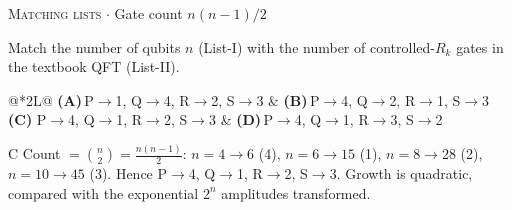 \documentclass[11pt,a4paper]{article}
\newcommand{\optlabel}[1]{\textbf{(#1)}}
\newcommand{\correctlabel}[1]{\textcolor{okgreen}{\textbf{(#1)}\,\ding{51}}}
\newenvironment{qitem}[1]{\begin{list}{}{\setlength{\leftmargin}{3.3em}\setlength{\labelwidth}{3.1em}%
  \setlength{\labelsep}{0.2em}\setlength{\topsep}{3pt}\setlength{\parsep}{3pt}}\item[\textbf{Q.#1}\hfill]}{\end{list}}
\newcommand{\qsep}{\par\vspace{2pt}{\color{black!15}\hrule}\vspace{4pt}}
\newcommand{\qmeta}[2]{{\footnotesize\color{black!60}\textsc{#1} \;$\cdot$\; #2}\par}
\begin{document}
\begin{qitem}{55}
\qmeta{Matching lists}{Gate count $n(n-1)/2$}
Match the number of qubits $n$ (List-I) with the number of controlled-$R_k$ gates in the textbook QFT (List-II).
\par\smallskip{}
\par\smallskip\noindent\begin{tabularx}{\linewidth}{@{}*{2}{L}@{}}
\optlabel{A}\,P$\to$1, Q$\to$4, R$\to$2, S$\to$3 & \optlabel{B}\,P$\to$4, Q$\to$2, R$\to$1, S$\to$3 \\[3pt]
\correctlabel{C}\,P$\to$4, Q$\to$1, R$\to$2, S$\to$3 & \optlabel{D}\,P$\to$4, Q$\to$1, R$\to$3, S$\to$2
\end{tabularx}
\end{qitem}
\begin{solbox}{C}
Count $= \binom{n}{2} = \frac{n(n-1)}{2}$: $n = 4 \to 6$ (4), $n = 6 \to 15$ (1), $n = 8 \to 28$ (2), $n = 10 \to 45$ (3).
Hence P$\to$4, Q$\to$1, R$\to$2, S$\to$3. Growth is quadratic, compared with the exponential $2^n$ amplitudes transformed.
\end{solbox}
\qsep
\end{document}
